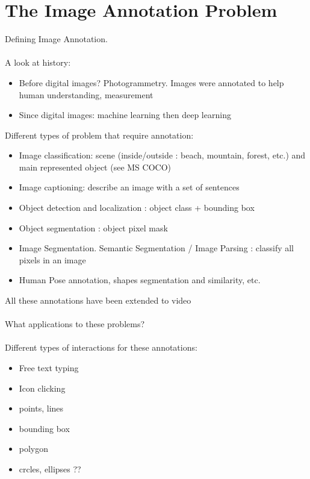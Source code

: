 \chapter{The Image Annotation Problem}%
\label{cha:the_image_annotation_problem}

Defining Image Annotation. \\ \\ 



A look at history:
\begin{itemize}
	\item Before digital images? Photogrammetry. Images were annotated to help human understanding, measurement
	\item Since digital images: machine learning then deep learning
\end{itemize}


Different types of problem that require annotation:
\begin{itemize}
	\item Image classification: scene (inside/outside : beach, mountain, forest, etc.) and main represented object (see MS COCO)
	\item Image captioning: describe an image with a set of sentences
	\item Object detection and localization : object class + bounding box
	\item Object segmentation : object pixel mask
	\item Image Segmentation. Semantic Segmentation / Image Parsing : classify all pixels in an image
	\item Human Pose annotation, shapes segmentation and similarity, etc.
\end{itemize}
All these annotations have been extended to video \\ \\

What applications to these problems? \\ \\

Different types of interactions for these annotations:

\begin{itemize}
	\item Free text typing
	\item Icon clicking
	\item points, lines
	\item bounding box
	\item polygon
	\item crcles, ellipses ??
\end{itemize}

